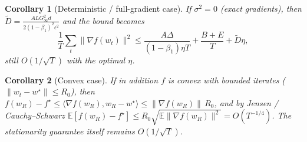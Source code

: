 \documentclass[11pt]{article}
\newtheorem{corollary}{Corollary}
\begin{document}
\begin{corollary}[Deterministic / full-gradient case]
If $\sigma^2=0$ (exact gradients), then
$\tilde D=\frac{A L G_\infty^2 d}{2(1-\beta_1)^2\epsilon^2}$ and the bound
becomes
\[
\frac1T\sum_t\|\nabla f(w_t)\|^2
\le \frac{A\Delta}{(1-\beta_1)\eta T} + \frac{B+E}{T} + \tilde D\eta,
\]
still $O(1/\sqrt T)$ with the optimal $\eta$.
\end{corollary}

\begin{corollary}[Convex case]
If in addition $f$ is convex with bounded iterates ($\|w_t-w^\star\|\le R_0$),
then $f(w_R)-f^\star\le \langle\nabla f(w_R),w_R-w^\star\rangle
\le \|\nabla f(w_R)\|\,R_0$, and by Jensen / Cauchy--Schwarz
$\mathbb{E}[f(w_R)-f^\star]\le R_0\sqrt{\mathbb{E}\|\nabla f(w_R)\|^2}
= O(T^{-1/4})$. The stationarity guarantee itself remains $O(1/\sqrt T)$.
\end{corollary}

\end{document}
